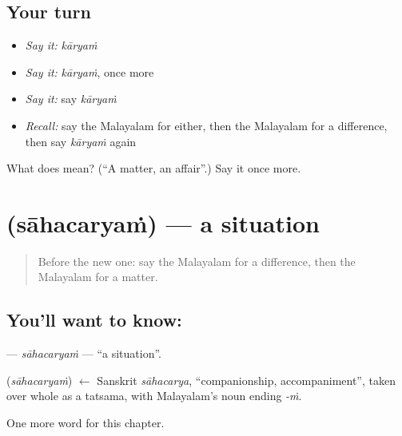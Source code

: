 \subsection*{Your turn}
\begin{itemize}
\raggedright
  \item \emph{Say it:} \emph{kāryaṁ}
  \item \emph{Say it:} \emph{kāryaṁ}, once more
  \item \emph{Say it:} say \emph{kāryaṁ}
  \item \emph{Recall:} say the Malayalam for either, then the Malayalam for a difference, then say \emph{kāryaṁ} again
\end{itemize}

\begin{tcolorbox}[breakable,colback=teal!4,colframe=teal!35!black,title={Before you move on}]
What does  mean? (\textquotedblleft{}A matter, an affair\textquotedblright{}.) Say it once more.
\end{tcolorbox}
\section[\texorpdfstring{\ml{സാഹചര്യം} (sāhacaryaṁ)}{സാഹചര്യം (sāhacaryaṁ)}]{ (sāhacaryaṁ) — a situation}

\label{lesson:ML-C242-sahacaryam}



\begin{quote}
Before the new one: say the Malayalam for a difference, then the Malayalam for a matter.
\end{quote}

\subsection*{You'll want to know: }
\textbf{} — \emph{sāhacaryaṁ} — \textquotedblleft{}a situation\textquotedblright{}.

\begin{cousinweb}
\textbf{} (\emph{sāhacaryaṁ}) $\leftarrow$ Sanskrit \emph{sāhacarya}, \textquotedblleft{}companionship, accompaniment\textquotedblright{}, taken over whole as a tatsama, with Malayalam's noun ending \emph{-ṁ}.
\end{cousinweb}

\begin{grammarlens}[title={What you've built}]
One more word for this chapter.
\end{grammarlens}

